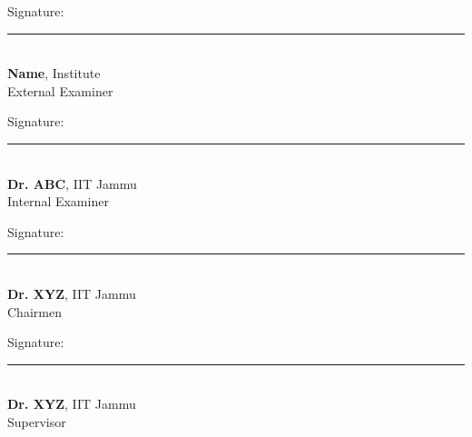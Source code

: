 	\begin{flushright}

		Signature:\rule{7.0cm}{0.5pt} \\
		\hspace{2pt}\textbf{Name}, Institute\\
		\hspace{2pt}External Examiner\\
		\vspace*{1.5cm}

		Signature:\rule{7.0cm}{0.5pt} \\
		\hspace{2pt}\textbf{Dr. ABC}, IIT Jammu\\
		\hspace{2pt}Internal Examiner\\
		\vspace*{1.5cm}
		
		Signature:\rule{7.0cm}{0.5pt} \\
		\hspace{2pt}\textbf{Dr. XYZ}, IIT Jammu\\
		\hspace{2pt}Chairmen\\
		\vspace*{1.5cm}
		
		Signature:\rule{7.0cm}{0.5pt} \\
		\hspace{2pt}\textbf{Dr. XYZ}, IIT Jammu\\
		\hspace{2pt}Supervisor\\
	\end{flushright}
\hfill



